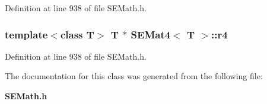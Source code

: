 Definition at line 938 of file S\+E\+Math.\+h.

\subsubsection[{r4}]{\setlength{\rightskip}{0pt plus 5cm}template$<$class T$>$ T $\ast$ {\bf S\+E\+Mat4}$<$ T $>$\+::r4}\label{class_s_e_mat4_a3c2cade81f7cebb1feb02caaf0d7adbc}


Definition at line 938 of file S\+E\+Math.\+h.



The documentation for this class was generated from the following file\+:\begin{DoxyCompactItemize}
\item 
{\bf S\+E\+Math.\+h}\end{DoxyCompactItemize}
